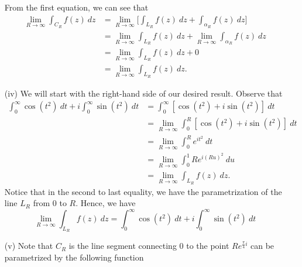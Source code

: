 \documentclass[a4paper]{article}
\begin{document}
\begin{solution}
\begin{enumerate}
            From the first equation, we can see that  
            \begin{align*}
                \lim_{ R \to \infty  }  \int_{ {C}_{R} }^{  } f(z) \ dz &= \lim_{ R \to \infty  }  \Big[ \int_{ {L}_{R} }^{  } f(z) \ dz + \int_{ {\alpha}_{R} }^{  } f(z) \ dz \Big] \\
                                                                        &= \lim_{ R \to \infty  }  \int_{ {L}_{R} }^{  } f(z) \ dz + \lim_{ R \to \infty  }  \int_{ {\alpha}_{R} }^{  } f(z) \ dz \\
                                                                        &= \lim_{ R \to \infty  }  \int_{ {L}_{R} }^{  } f(z) \ dz + 0 \tag{part(ii)} \\
                                                                        &= \lim_{ R \to \infty  }  \int_{ {L}_{R} }^{  } f(z) \ dz.
            \end{align*}
        \item[(iv)] We will start with the right-hand side of our desired result. Observe that 
            \begin{align*}
                \int_{ 0 }^{ \infty  }  \cos (t^{2}) \ dt + i \int_{ 0 }^{ \infty  }  \sin (t^{2}) \ dt &= \int_{ 0 }^{ \infty  } [ \cos (t^{2}) + i \sin (t^{2}) ] \ dt \\
                                                                                                        &= \lim_{ R \to \infty  } \int_{ 0 }^{ R  } [\cos(t^{2}) + i\sin (t^{2}) ] \ dt \\
                                                                                                        &= \lim_{ R \to \infty  } \int_{ 0 }^{ R } e^{i t^{2}} \ dt \\
                                                                                                        &= \lim_{ R \to \infty  }   \int_{ 0 }^{ 1 } R e^{i (Ru)^{2} }    \ du \\
                                                                                                        &= \lim_{ R \to \infty  } \int_{ {L}_{R} }^{  } f(z) \ dz. 
            \end{align*}
            Notice that in the second to last equality, we have the parametrization of the line \( {L}_{R} \) from \( 0  \) to \( R  \). Hence, we have 
            \[ \lim_{ R \to \infty  }  \int_{ {L}_{R} }^{  } f(z) \ dz =  \int_{ 0 }^{ \infty  }  \cos (t^{2}) \ dt + i \int_{ 0 }^{ \infty  }  \sin (t^{2}) \ dt  \]
        \item[(v)] Note that \( {C}_{R} \) is the line segment connecting \( 0  \) to the point \( R e^{ \frac{ \pi  }{ 4 } i}  \) can be parametrized by the following function 

\end{enumerate}
\end{solution}
\end{document}
